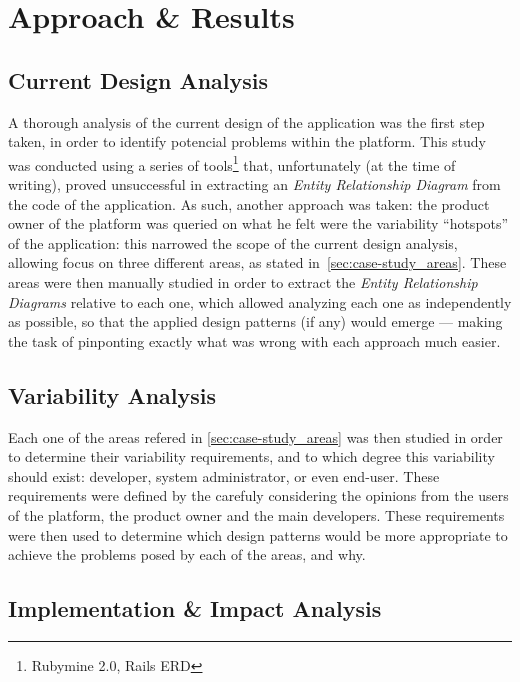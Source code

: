 \chapter{Approach \& Results}\label{chap:approach_results}

\section{Current Design Analysis}\label{sec:current_design_analysis}

A thorough analysis of the current design of the application was the first step taken, in order to identify potencial problems within the platform. This study was conducted using a series of tools\footnote{Rubymine 2.0\cite{rubymine}, Rails ERD\cite{rails_erd}} that, unfortunately (at the time of writing), proved unsuccessful in extracting an \emph{Entity Relationship Diagram} from the code of the application. As such, another approach was taken: the product owner of the platform was queried on what he felt were the variability ``hotspots'' of the application: this narrowed the scope of the current design analysis, allowing focus on three different areas, as stated in~\ref{sec:case-study_areas}. These areas were then manually studied in order to extract the \emph{Entity Relationship Diagrams} relative to each one, which allowed analyzing each one as independently as possible, so that the applied design patterns (if any) would emerge --- making the task of pinponting exactly what was wrong with each approach much easier.

\section{Variability Analysis}\label{sec:variability_analysis}

Each one of the areas refered in \ref{sec:case-study_areas} was then studied in order to determine their variability requirements, and to which degree this variability should exist: developer, system administrator, or even end-user. These requirements were defined by the carefuly considering the opinions from the users of the platform, the product owner and the main developers. These requirements were then used to determine which design patterns would be more appropriate to achieve the problems posed by each of the areas, and why.

\section{Implementation \& Impact Analysis}

